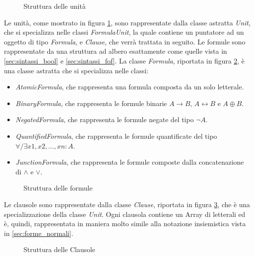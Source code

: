 \documentclass[./main.tex]{subfiles}
\begin{document}
\begin{figure}[H]
    \centering
    \scalebox{0.55}{
        
    }
    \caption{Struttura delle unità}
    \label{fig:vampire_units}
\end{figure}


Le unità, come mostrato in figura \ref{fig:vampire_units}, sono rappresentate dalla classe astratta \textit{Unit},
che si specializza nelle classi \textit{FormulaUnit}, la quale contiene un puntatore ad un oggetto di tipo \textit{Formula},
e \textit{Clause}, che verrà trattata in seguito.
Le formule sono rappresentate da una struttura ad albero esattamente come quelle vista in \ref{sec:sintassi_bool} e \ref{sec:sintassi_fof}.
La classe \textit{Formula}, riportata in figura \ref{fig:vampire_formulas}, è una classe astratta che si specializza nelle classi:
\begin{itemize}
    \item \textit{AtomicFormula}, che rappresenta una formula composta da un solo letterale.
    \item \textit{BinaryFormula}, che rappresenta le formule binarie $A \rightarrow B$, $A \leftrightarrow B$ e $A \oplus B$.
    \item \textit{NegatedFormula}, che rappresenta le formule negate del tipo $\lnot A$.
    \item \textit{QuantifiedFormula}, che rappresenta le formule quantificate del tipo $\forall/\exists x1, x2, ..., xn : A$.
    \item \textit{JunctionFormula}, che rappresenta le formule composte dalla concatenazione di $\land$ e $\lor$.
\end{itemize}

\begin{figure}[H]
    \centering
    \scalebox{0.5}{
        
    }
    \caption{Struttura delle formule}
    \label{fig:vampire_formulas}
\end{figure}

Le clausole sono rappresentate dalla classe \textit{Clause}, riportata in figura \ref{fig:vampire_clauses}, che è una specializzazione della classe \textit{Unit}.
Ogni clausola contiene un Array di letterali ed è, quindi, rappresentata in maniera molto simile alla notazione insiemistica 
vista in \ref{sec:forme_normali}.

\begin{figure}[H]
    \centering
    \scalebox{0.55}{
        
    }
    
    \caption{Struttura delle Clausole}
    \label{fig:vampire_clauses}
\end{figure}
\end{document}
